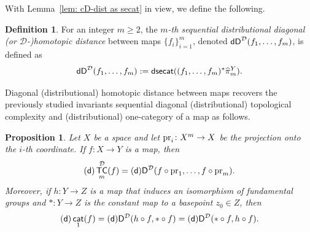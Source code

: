 \documentclass[amscd,amssymb,verbatim,10pt]{amsart}
\numberwithin{equation}{section}
\theoremstyle{plain}
\newtheorem{proposition}[theorem]{Proposition}
\theoremstyle{definition}
\newtheorem{definition}[theorem]{Definition}
\DeclareMathOperator{\cat}{{\mathsf{cat}}}
\DeclareMathOperator{\TC}{{\mathsf{TC}}}
\DeclareMathOperator{\dsecat}{{\mathsf{dsecat}}}
\def\pr{\protect\operatorname{pr}}
\newcommand{\D}{{\sf {D}}}
\newcommand{\sd}{{(\sf {d})}}
\newcommand{\dD}{{\sf {dD}}}
\newcommand{\cD}{{\mathcal{D}}}
\def\wh{\widehat}
\begin{document}
With Lemma~\ref{lem: cD-dist as secat} in view, we define the following.

\begin{definition}\label{def: d-diagonal dist}
For an integer $m\ge 2$, the $m$\emph{-th sequential distributional diagonal (or $\cD$-)homotopic distance} between maps $\{f_i\}_{i=1}^m$, denoted $\dD^{\cD}(f_1,\dots,f_m)$, is defined as
\[
\dD^{\cD}(f_1,\dots,f_m):=\dsecat((f_1,\dots,f_m)^*\wh\pi^Y_m).
\]    
\end{definition}

Diagonal (distributional) homotopic distance between maps recovers the previously studied invariants sequential diagonal (distributional) topological complexity and (distributional) one-category of a map as follows.

\begin{proposition}\label{prop: recovering cd-tcf}
    Let $X$ be a space and let $\pr_i\colon X^m\to X$ be the projection onto the $i$-th coordinate. If $f\colon X\to Y$ is a map, then 
    \[
    \sd\TC^{\cD}_m(f)=\sd\D^{\cD}(f\circ \pr_1,\dots,f\circ\pr_m).
    \]
    Moreover, if $h\colon Y\to Z$ is a map that induces an isomorphism of fundamental groups and $\ast\colon Y\to Z$ is the constant map to a basepoint $z_0\in Z$, then
    \[
    \sd\cat_1(f)=\sd\D^{\cD}(h\circ f,\ast\circ f)=\sd\D^{\cD}(\ast\circ f,h\circ f).
    \]        
\end{proposition}
\end{document}
